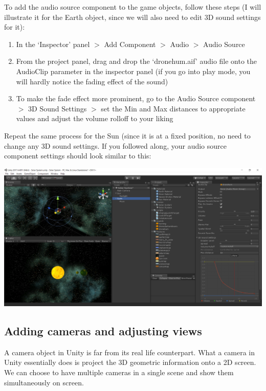 \documentclass{article}[a4paper,12pt]
\theoremstyle{definition}
\begin{document}
To add the audio source component to the game objects, follow these steps (I will illustrate it for the Earth object, since we will also need to edit 3D sound settings for it):
\begin{enumerate}
	\item In the `Inspector' panel $>$ Add Component $>$ Audio $>$ Audio Source
	\item From the project panel, drag and drop the `dronehum.aif' audio file onto the AudioClip parameter in the inspector panel (if you go into play mode, you will hardly notice the fading effect of the sound)
	\item To make the fade effect more prominent, go to the Audio Source component $>$ 3D Sound Settings $>$ set the Min and Max distances to appropriate values and adjust the volume rolloff to your liking
\end{enumerate}
Repeat the same process for the Sun (since it is at a fixed position, no need to change any 3D sound settings. If you followed along, your audio source component settings should look similar to this:
\begin{center}
\includegraphics[width=\textwidth]{adding_audio.png}
\end{center}
\subsection{Adding cameras and adjusting views}
A camera object in Unity is far from its real life counterpart. What a camera in Unity essentially does is project the 3D geometric information onto a 2D screen. We can choose to have multiple cameras in a single scene and show them simultaneously on screen.
\vspace{6pt}
\end{document}
